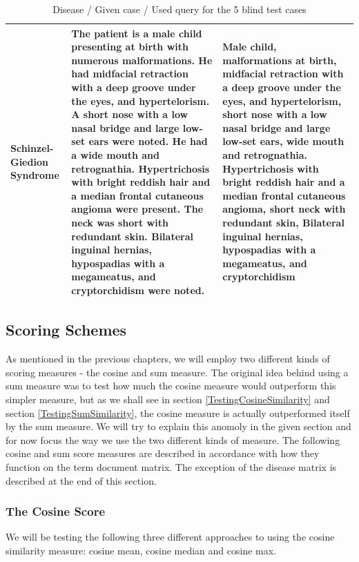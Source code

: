 \begin{table}[H]
\begin{scriptsize}
\begin{tabular}{| p{3cm} | p{4.5cm} | p{4.5cm} |}
      Schinzel-Giedion Syndrome & The patient is a male child presenting at birth with numerous malformations. He had midfacial retraction with a deep groove under the eyes, and hypertelorism. A short nose with a low nasal bridge and large low-set ears were noted. He had a wide mouth and retrognathia. Hypertrichosis with bright reddish hair and a median frontal cutaneous angioma were present. The neck was short with redundant skin. Bilateral inguinal hernias, hypospadias with a megameatus, and cryptorchidism were noted. & Male child, malformations at birth, midfacial retraction with a deep groove under the eyes, and hypertelorism, short nose with a low nasal bridge and large low-set ears, wide mouth and retrognathia. Hypertrichosis with bright reddish hair and a median frontal cutaneous angioma, short neck with redundant skin, Bilateral inguinal hernias, hypospadias with a megameatus, and cryptorchidism \\
      \hline
    \end{tabular}
  \end{scriptsize}
  \caption{Disease / Given case / Used query for the 5 blind test cases}
  \label{BlindTestDiseaseName}
\end{table}

\subsection{Scoring Schemes}

As mentioned in the previous chapters, we will employ two different
kinds of scoring measures - the cosine and sum measure. The original
idea behind using a sum measure was to test how much the cosine
measure would outperform this simpler measure, but as we shall see in
section \ref{TestingCosineSimilarity} and section
\ref{TestingSumSimilarity}, the cosine measure is actually
outperformed itself by the sum measure. We will try to explain this
anomoly in the given section and for now focus the way we use the two
different kinds of measure. The following cosine and sum score
measures are described in accordance with how they function on the term
document matrix. The exception of the disease matrix is described at
the end of this section.

\subsubsection{The Cosine Score\label{CosineScore}}

We will be testing the following three different approaches to using
the cosine similarity measure: cosine mean, cosine median and cosine
max.

